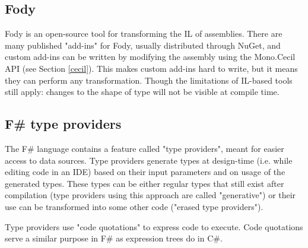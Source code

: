 \subsection{Fody}

Fody \cite{fody} is an open-source tool for transforming the \ac{IL} of assemblies. There are many published "add-ins" for Fody, usually distributed through NuGet, and custom add-ins can be written by modifying the assembly using the Mono.Cecil \ac{API} (see Section \ref{cecil}). This makes custom add-ins hard to write, but it means they can perform any transformation. Though the limitations of \ac{IL}-based tools still apply: changes to the shape of type will not be visible at compile time.

\subsection{F\# type providers}

The F\# language contains a feature called "type providers", \cite{type-providers} meant for easier access to data sources. Type providers generate types at design-time (i.e. while editing code in an \ac{IDE}) based on their input parameters and on usage of the generated types. These types can be either regular types that still exist after compilation (type providers using this approach are called "generative") or their use can be transformed into some other code ("erased type providers").

Type providers use "code quotations" to express code to execute. Code quotations serve a similar purpose in F\# as expression trees do in C\#.